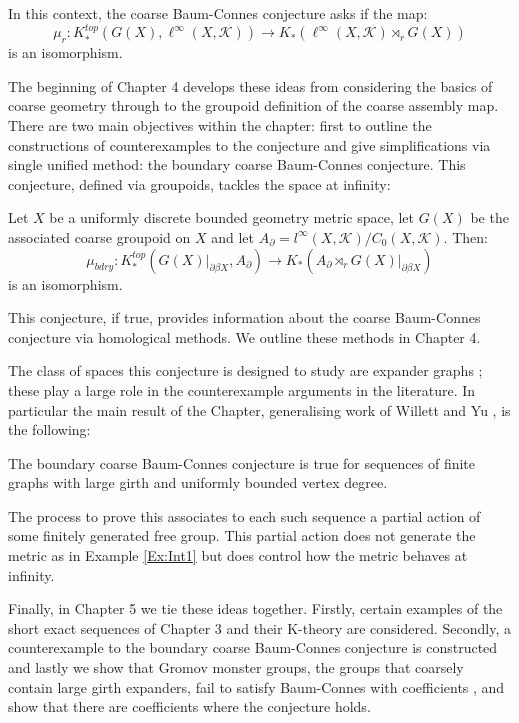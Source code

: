 In this context, the coarse Baum-Connes conjecture asks if the map:
\begin{equation*}
\mu_{r}:K_{*}^{top}(G(X), \ell^{\infty}(X,\mathcal{K})) \rightarrow K_{*}(\ell^{\infty}(X,\mathcal{K})\rtimes_{r}G(X))
\end{equation*}
is an isomorphism.

The beginning of Chapter 4 develops these ideas from considering the basics of coarse geometry through to the groupoid definition of the coarse assembly map. There are two main objectives within the chapter: first to outline the constructions of counterexamples to the conjecture \cite{higsonpreprint,MR1911663,explg1,explg2,MR2568691} and give simplifications via single unified method: the boundary coarse Baum-Connes conjecture. This conjecture, defined via groupoids, tackles the space at infinity:
\begin{conjecture}
Let $X$ be a uniformly discrete bounded geometry metric space, let $G(X)$ be the associated coarse groupoid on $X$ and let $A_{\partial}= l^{\infty}(X,\mathcal{K})/C_{0}(X,\mathcal{K})$. Then:
\begin{equation*}
\mu_{bdry}:K_{*}^{top}(G(X)|_{\partial\beta X}, A_{\partial}) \rightarrow K_{*}(A_{\partial}\rtimes_{r}G(X)|_{\partial\beta X})
\end{equation*}
is an isomorphism.
\end{conjecture}
This conjecture, if true, provides information about the coarse Baum-Connes conjecture via homological methods. We outline these methods in Chapter 4.

The class of spaces this conjecture is designed to study are expander graphs \cite{MR2247919}; these play a large role in the counterexample arguments in the literature. In particular the main result of the Chapter, generalising work of Willett and Yu \cite{explg1}, is the following:
\begin{thm}
The boundary coarse Baum-Connes conjecture is true for sequences of finite graphs with large girth and uniformly bounded vertex degree.
\end{thm}

The process to prove this associates to each such sequence a partial action of some finitely generated free group. This partial action does not generate the metric as in Example \ref{Ex:Int1} but does control how the metric behaves at infinity. 

Finally, in Chapter 5 we tie these ideas together. Firstly, certain examples of the short exact sequences of Chapter 3 and their K-theory are considered. Secondly, a counterexample to the boundary coarse Baum-Connes conjecture is constructed and lastly we show that Gromov monster groups, the groups that coarsely contain large girth expanders, fail to satisfy Baum-Connes with coefficients \cite{MR1978492,exrangrps}, and show that there are coefficients where the conjecture holds.

